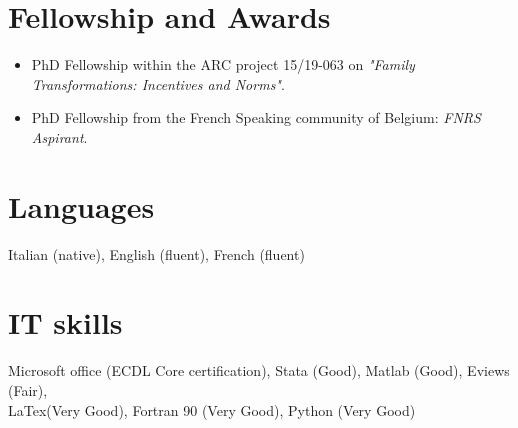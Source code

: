 \documentclass[10pt]{article} %
\begin{document}



\section{Fellowship and Awards}
\begin{itemize}
\item PhD Fellowship within the ARC project 15/19-063 on \textit{"Family Transformations: Incentives and Norms"}.
\item PhD Fellowship from the French Speaking community of Belgium:  \textit{FNRS Aspirant}.
\end{itemize}




\section{Languages}
Italian (native), English (fluent), French (fluent)



\section{IT skills}
Microsoft office (ECDL Core certification), Stata (Good), Matlab (Good), Eviews (Fair),\\ LaTex(Very Good), Fortran 90 (Very Good), Python (Very Good)
\end{document}
